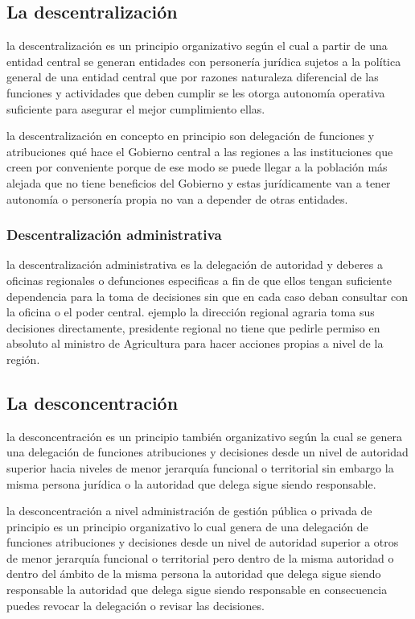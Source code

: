 \documentclass[
  a4paper,
]{article}
\begin{document}
\subsection{La descentralización}\label{la-descentralizaciuxf3n-1}

la descentralización es un principio organizativo según el cual a partir
de una entidad central se generan entidades con personería jurídica
sujetos a la política general de una entidad central que por razones
naturaleza diferencial de las funciones y actividades que deben cumplir
se les otorga autonomía operativa suficiente para asegurar el mejor
cumplimiento ellas.

la descentralización en concepto en principio son delegación de
funciones y atribuciones qué hace el Gobierno central a las regiones a
las instituciones que creen por conveniente porque de ese modo se puede
llegar a la población más alejada que no tiene beneficios del Gobierno y
estas jurídicamente van a tener autonomía o personería propia no van a
depender de otras entidades.

\subsubsection{Descentralización
administrativa}\label{descentralizaciuxf3n-administrativa}

la descentralización administrativa es la delegación de autoridad y
deberes a oficinas regionales o defunciones especificas a fin de que
ellos tengan suficiente dependencia para la toma de decisiones sin que
en cada caso deban consultar con la oficina o el poder central. ejemplo
la dirección regional agraria toma sus decisiones directamente,
presidente regional no tiene que pedirle permiso en absoluto al ministro
de Agricultura para hacer acciones propias a nivel de la región.

\subsection{La desconcentración}\label{la-desconcentraciuxf3n}

la desconcentración es un principio también organizativo según la cual
se genera una delegación de funciones atribuciones y decisiones desde un
nivel de autoridad superior hacia niveles de menor jerarquía funcional o
territorial sin embargo la misma persona jurídica o la autoridad que
delega sigue siendo responsable.

la desconcentración a nivel administración de gestión pública o privada
de principio es un principio organizativo lo cual genera de una
delegación de funciones atribuciones y decisiones desde un nivel de
autoridad superior a otros de menor jerarquía funcional o territorial
pero dentro de la misma autoridad o dentro del ámbito de la misma
persona la autoridad que delega sigue siendo responsable la autoridad
que delega sigue siendo responsable en consecuencia puedes revocar la
delegación o revisar las decisiones.
\end{document}
